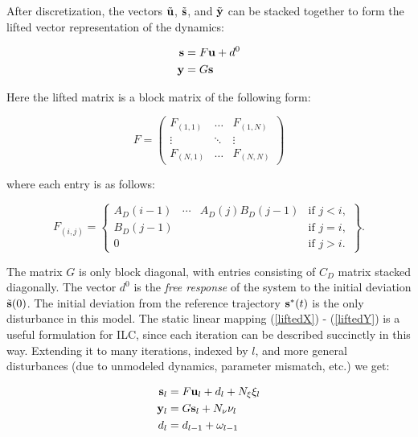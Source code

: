After discretization, the vectors $\tilde{\mathbf{u}}$, $\tilde{\mathbf{s}}$, and $\tilde{\mathbf{y}}$ can be stacked together to form the lifted vector representation of the dynamics:

\begin{align}
\mathbf{s} &= F\mathbf{u} + d^{0} \label{liftedX} \\
\mathbf{y} &= G\mathbf{s} \label{liftedY}
\end{align}

Here the lifted matrix is a block matrix of the following form:

\begin{equation}
F = 
\left(
\begin{array}{ccc}
F_{(1,1)} & \ldots & F_{(1,N)} \\
\vdots & \ddots & \vdots \\
F_{(N,1)} & \ldots & F_{(N,N)} 
\end{array} \right)
\end{equation}

where each entry is as follows:

\begin{equation}
F_{(i,j)} = 
\left\{
\begin{array}{cccc}
A_{D}(i-1) & \dotsi & A_{D}(j)B_{D}(j-1) & \text{if } j < i,\\
B_{D}(j-1) & & & \text{if } j = i,\\
0 & & & \text{if } j > i.
\end{array} 
\right\}.
\end{equation}

The matrix $G$ is only block diagonal, with entries consisting of $C_{D}$ matrix stacked diagonally.
The vector $d^{0}$ is the \emph{free response} of the system to the initial deviation $\tilde{\mathbf{s}}(0)$. The initial deviation from the reference trajectory $\mathbf{s}^{*}(t)$ is the only disturbance in this model. The static linear mapping (\ref{liftedX}) - (\ref{liftedY}) is a useful formulation for ILC, since each iteration can be described succinctly in this way. Extending it to many iterations, indexed by $l$, and more general disturbances (due to unmodeled dynamics, parameter mismatch, etc.) we get:

\begin{align}
\mathbf{s}_{l} &= F\mathbf{u}_{l} + d_{l} + N_{\xi}\xi_{l} \label{liftedXiter} \\
\mathbf{y}_{l} &= G\mathbf{s}_{l} + N_{\nu}\nu_{l} \label{liftedYiter} \\
d_{l} &= d_{l-1}	+ \omega_{l-1} \label{dEvolution}	
\end{align}

